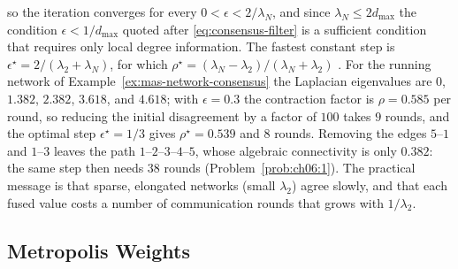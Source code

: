 \documentclass[graybox,envcountchap]{style/SNmono}
\begin{document}
so the iteration converges for every $0<\epsilon<2/\lambda_N$, and since $\lambda_N\le 2d_{\max}$ the condition $\epsilon<1/d_{\max}$ quoted after \eqref{eq:consensus-filter} is a sufficient condition that requires only local degree information. The fastest constant step is $\epsilon^{\star}=2/(\lambda_2+\lambda_N)$, for which $\rho^{\star}=(\lambda_N-\lambda_2)/(\lambda_N+\lambda_2)$ \cite{xiao2004_fast_averaging}. For the running network of Example~\ref{ex:mas-network-consensus} the Laplacian eigenvalues are $0$, $1.382$, $2.382$, $3.618$, and $4.618$; with $\epsilon=0.3$ the contraction factor is $\rho=0.585$ per round, so reducing the initial disagreement by a factor of $100$ takes $9$ rounds, and the optimal step $\epsilon^{\star}=1/3$ gives $\rho^{\star}=0.539$ and $8$ rounds. Removing the edges $5$--$1$ and $1$--$3$ leaves the path $1$--$2$--$3$--$4$--$5$, whose algebraic connectivity is only $0.382$: the same step then needs $38$ rounds (Problem~\ref{prob:ch06:1}). The practical message is that sparse, elongated networks (small $\lambda_2$) agree slowly, and that each fused value costs a number of communication rounds that grows with $1/\lambda_2$.

\subsection{Metropolis Weights}
\label{subsec:mas-metropolis}
\end{document}
